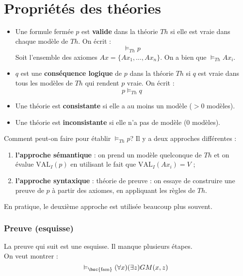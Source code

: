 \chapter*{Propriétés des théories}
\begin{itemize}
\item Une formule fermée $p$ est \textbf{valide} dans la théorie $Th$ si elle est vraie dans chaque modèle de $Th$. On écrit : 
$$\vDash_{Th} p$$
Soit l'ensemble des axiomes $Ax=\{Ax_1, \hdots, Ax_n\}$. On a bien que $\vDash_{Th} Ax_i$.\\
\item $q$ est une \textbf{conséquence logique} de $p$ dans la théorie $Th$ si $q$ est vraie dans tous les modèles de $Th$ qui rendent $p$ vraie. On écrit :  
$$p \vDash_{Th} q$$
\item Une théorie est \textbf{consistante} si elle a au moins un modèle ($>0$ modèles).
\item Une théorie est \textbf{inconsistante} si elle n'a pas de modèle ($0$ modèles).\\
\end{itemize}

Comment peut-on faire pour établir $\vDash_{Th} p$? Il y a deux approches différentes :
\begin{enumerate}
\item \textbf{l'approche sémantique} : on prend un modèle quelconque de $Th$ et on évalue $\text{VAL}_I (p)$ en utilisant le fait que $\text{VAL}_I (Ax_i)=V$ ;
\item \textbf{l'approche syntaxique} : théorie de preuve : on essaye de construire une preuve de $p$ à partir des axiomes, en appliquant les règles de $Th$.\\
\end{enumerate}
En pratique, le deuxième approche est utilisée beaucoup plus souvent.\\


\subsection*{Preuve (esquisse)}
La preuve qui suit est une esquisse. Il manque plusieurs étapes.\\
On veut montrer  : 
$$\vDash_{\text{\bsc{fam}}} (\forall x)(\exists z) GM(x,z)$$

